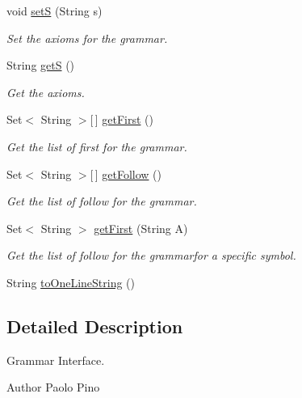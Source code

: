 \begin{DoxyCompactItemize}
void \hyperlink{interfacecontext_free_1_1grammar_1_1_i_grammar_a134f8b2183ec804eff78ac57b16a0ab9}{set\-S} (String s)
\begin{DoxyCompactList}\small\item\em Set the axioms for the grammar. \end{DoxyCompactList}\item 
String \hyperlink{interfacecontext_free_1_1grammar_1_1_i_grammar_aceb36e584d26bd39a0f5186742cc9b5b}{get\-S} ()
\begin{DoxyCompactList}\small\item\em Get the axioms. \end{DoxyCompactList}\item 
Set$<$ String $>$\mbox{[}$\,$\mbox{]} \hyperlink{interfacecontext_free_1_1grammar_1_1_i_grammar_a256e9280e008a7c709ccb80725ccc0f2}{get\-First} ()
\begin{DoxyCompactList}\small\item\em Get the list of first for the grammar. \end{DoxyCompactList}\item 
Set$<$ String $>$\mbox{[}$\,$\mbox{]} \hyperlink{interfacecontext_free_1_1grammar_1_1_i_grammar_aad085d9f84a32ca1abe5fba0c9e5f20c}{get\-Follow} ()
\begin{DoxyCompactList}\small\item\em Get the list of follow for the grammar. \end{DoxyCompactList}\item 
Set$<$ String $>$ \hyperlink{interfacecontext_free_1_1grammar_1_1_i_grammar_a7a05f11e88cdbe29db1849541592e272}{get\-First} (String A)
\begin{DoxyCompactList}\small\item\em Get the list of follow for the grammarfor a specific symbol. \end{DoxyCompactList}\item 
String \hyperlink{interfacecontext_free_1_1grammar_1_1_i_grammar_a5fdeb5a6a9426b400c2fe805566a377c}{to\-One\-Line\-String} ()
\end{DoxyCompactItemize}


\subsection{Detailed Description}
Grammar Interface. 

\begin{DoxyAuthor}{Author}
Paolo Pino 
\end{DoxyAuthor}


